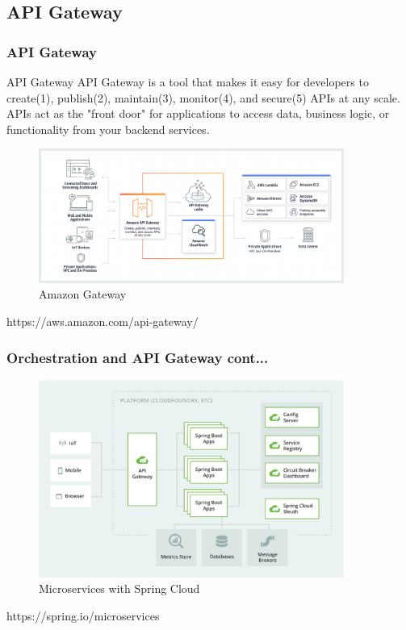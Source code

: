 \documentclass{beamer}
\begin{document}
	\subsection {API Gateway}
		\begin{frame}
		\frametitle{API Gateway}
			\scriptsize
			\begin{block} {API Gateway}
				\scriptsize {API Gateway is a tool that makes it easy for developers to create(1), publish(2), maintain(3), monitor(4), and secure(5) APIs at any scale. APIs act as the "front door" for applications to access data, business logic, or functionality from your backend services}.
			\end{block}
			\begin{figure}[h]
				\includegraphics[width=100mm, scale=1]{img/amazon-gateway.png}
				\caption{Amazon Gateway}
			\end{figure}\vspace{1mm}
		
			\tiny{https://aws.amazon.com/api-gateway/}	
		\end{frame}
	
		\begin{frame}
			\frametitle{Orchestration and API Gateway cont...}
				\begin{figure}[h]
					\includegraphics[width=100mm, scale=2]{img/microservice-diagrame.png}
					\caption{Microservices with Spring Cloud}
				\end{figure}\vspace{20mm}
				
				\tiny{https://spring.io/microservices}	
		\end{frame}
	
\end{document}
